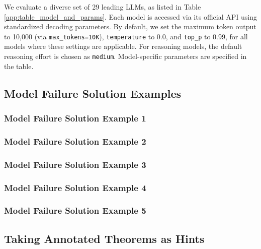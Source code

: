 We evaluate a diverse set of 29 leading LLMs, as listed in Table \ref{app:table_model_and_params}. Each model is accessed via its official API using standardized decoding parameters. By default, we set the maximum token output to 10,000 (via \texttt{max\_tokens=10K}), \texttt{temperature} to 0.0, and \texttt{top\_p} to 0.99, for all models where these settings are applicable. For reasoning models, the default reasoning effort is chosen as \texttt{medium}. Model-specific parameters are specified in the table.




\clearpage
\subsection{Model Failure Solution Examples}
\label{app:incorrect_solution_examples}


\subsubsection{Model Failure Solution Example 1}
\label{app:failure_solution_example_1}


\clearpage
\subsubsection{Model Failure Solution Example 2}
\label{app:failure_solution_example_2}


\clearpage
\subsubsection{Model Failure Solution Example 3}
\label{app:failure_solution_example_3}


\clearpage
\subsubsection{Model Failure Solution Example 4}
\label{app:failure_solution_example_4}


\clearpage
\subsubsection{Model Failure Solution Example 5}
\label{app:failure_solution_example_5}



\clearpage
\subsection{Taking Annotated Theorems as Hints}
\label{app:explore_theorem_as_hints_appendix}

